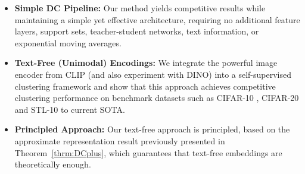 \begin{itemize}
\item \textbf{Simple DC Pipeline:}
Our method yields competitive results while maintaining a simple yet effective architecture, requiring no additional feature layers, support sets, teacher-student networks, text information, or exponential moving averages.
\item \textbf{Text-Free (Unimodal) Encodings:}
We integrate the powerful image encoder from CLIP (and also experiment with DINO) into a self-supervised clustering framework and show that this approach achieves competitive clustering performance on benchmark datasets such as CIFAR-10 \cite{krizhevsky2009learning}, CIFAR-20 \cite{krizhevsky2009learning} and STL-10 \cite{krizhevsky2009learning} to current SOTA.
\item \textbf{Principled Approach:} 
Our text-free approach is principled, based on the approximate representation result previously presented in Theorem~\ref{thrm:DCplus}, which guarantees that text-free embeddings are theoretically enough.
\end{itemize}









